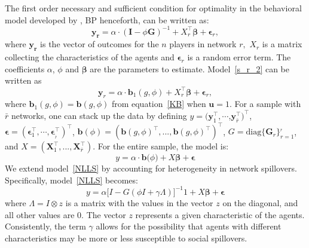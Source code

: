 \documentclass[nojss]{jss}
\begin{document}
The first order necessary and sufficient condition for optimality in the behavioral model developed by \cite{Battaglini+Patacchini:2018}, BP henceforth, can be written as:
\begin{equation}
\mathbf{y}_{\mathbf{r}}=\alpha \cdot \left( \boldsymbol{I}-\phi \boldsymbol{G%
}\right) ^{-1}+X_{r}^\top\mathbf{\beta }+\mathbf{\epsilon }_{r},
\label{s_r_2}
\end{equation}
where $\mathbf{y}_{\mathbf{r}}$ is the vector of outcomes for the $n$ players in network $r\mathbf{,}$ $X_{r}$ is a matrix collecting the characteristics of the agents and $\mathbf{\epsilon }_{r}$ is a random error term. The coefficients $\alpha $, $\phi $ and $\mathbf{\beta }$ are the parameters to estimate. Model~\ref{s_r_2} can be written as
\begin{equation}
\mathbf{y}_{r}=\alpha \cdot \boldsymbol{b}_{1}\left( g,\phi \right)
+X_{r}^\top\mathbf{\beta }+\mathbf{\epsilon }_{r},
\end{equation}%
where $\boldsymbol{b}_{1}\left(g,\phi \right) =\boldsymbol{b}\left(g,\phi
\right) $ from equation~\ref{KB} when $\boldsymbol{u}=1$.\newline
For a sample with $\bar{r}$ networks, one can stack up the data by defining $y=(\mathbf{y}_{1}^\top,\cdots$,$\mathbf{y}_{\bar{r}}^\top)^\top$, $\mathbf{\epsilon }=(\boldsymbol{\epsilon }_{1}^\top,\cdots ,\boldsymbol{\epsilon }_{_{\bar{r}}}^\top)^\top$, $\mathbf{b}(\phi)=\left(\boldsymbol{b}\left(g,\phi \right)^\top,...,\boldsymbol{b}\left(g,\phi\right)^\top\right) ^\top$, $G=\mathrm{diag}\{\boldsymbol{G}_{r}\}_{r=1}^{_{\bar{r}}}$, and $X=(\boldsymbol{X}_{1}^\top,...,\boldsymbol{X}_{\overline{r}}^\top)$. For the entire sample, the model is: 
\begin{equation}
y=\alpha \cdot \mathbf{b(}\phi \mathbf{)}+X\mathbf{\beta}+\mathbf{\epsilon }  \label{NLLS}
\end{equation}
We extend model~\ref{NLLS} by accounting for heterogeneity in network spillovers. Specifically, model~\ref{NLLS} becomes:
\begin{equation}
y=\alpha \lbrack I-G(\phi I+\gamma \Lambda )]^{-1}1+X\mathbf{\beta }+\mathbf{\epsilon }  
\label{BP_2}
\end{equation}
where $\Lambda =I\otimes z$ is a matrix with the values in the vector $z$ on the diagonal, and all other values are 0. The vector $z$ represents a given characteristic of the agents. Consistently, the term $\gamma$ allows for the possibility that agents with different characteristics may be more or less susceptible to social spillovers.
\end{document}
